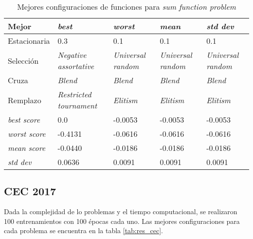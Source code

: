 \begin{table}[h!]
	\centering
	\begin{tabular}{|p{}|p{}|p{}|p{}|p{}|}
		\hline
			\textbf{Mejor} & \textbf{\textit{best}} & \textbf{\textit{worst}} & \textbf{\textit{mean}} & \textbf{\textit{std dev}}  \\ \hline
		Estacionaria & 0.3 & 0.1 & 0.1 & 0.1 \\
		Selección & \textit{Negative assortative} & \textit{Universal random} & \textit{Universal random}& \textit{Universal random} \\
		Cruza & \textit{Blend} & \textit{Blend} & \textit{Blend} &\textit{Blend} \\
		Remplazo & \textit{Restricted tournament} & \textit{Elitism} & \textit{Elitism} &\textit{Elitism} \\ \hline
		\textit{best score}& 0.0 & -0.0053 & -0.0053 & -0.0053 \\
		\textit{worst score}& -0.4131 & -0.0616 & -0.0616 & -0.0616 \\
		\textit{mean score}& -0.0440 & -0.0186 & -0.0186 &-0.0186 \\
		\textit{std dev}& 0.0636 & 0.0091 & 0.0091 &0.0091  \\ \hline
	\end{tabular}
	\caption{Mejores configuraciones de funciones para \textit{sum function problem}}
	\label{tab:res_sfp}
\end{table}

\subsection{CEC 2017}

Dada la complejidad de lo problemas y el tiempo computacional, se realizaron 100 entrenamientos con 100 épocas cada uno. Las mejores configuraciones para cada problema se encuentra en la tabla \ref{tab:res_cec}.

